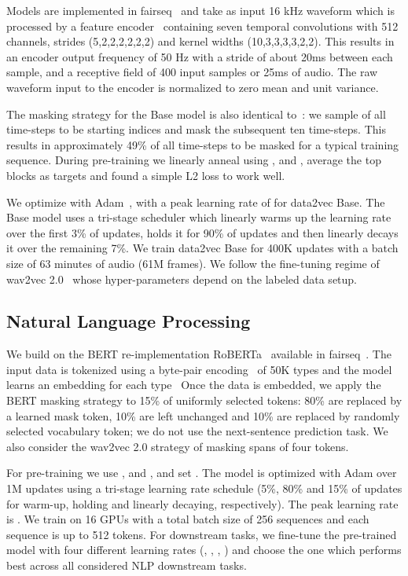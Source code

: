 \documentclass[nohyperref]{article}
\theoremstyle{plain}
\theoremstyle{definition}
\theoremstyle{remark}
\newcommand{\name}{data2vec}
\begin{document}
Models are implemented in fairseq~\cite{ott2019fairseq} and take as input 16 kHz waveform which is processed by a feature encoder~\citep{baevski2020wav} containing seven temporal convolutions with 512 channels, strides (5,2,2,2,2,2,2) and kernel widths (10,3,3,3,3,2,2).
This results in an encoder output frequency of 50 Hz with a stride of about 20ms between each sample, and a receptive field of 400 input samples or 25ms of audio. 
The raw waveform input to the encoder is normalized to zero mean and unit variance.

The masking strategy for the Base model is also identical to~\citet{baevski2020wav}: we sample  of all time-steps to be starting indices and mask the subsequent ten time-steps.
This results in approximately 49\% of all time-steps to be masked for a typical training sequence.
During pre-training we linearly anneal  using ,  and , average the top  blocks as targets and found a simple L2 loss to work well.

We optimize with Adam~\citep{kingma2015adam}, with a peak learning rate of  for \name{} Base. The Base model uses a tri-stage scheduler which linearly warms up the learning rate over the first 3\% of updates, holds it for 90\% of updates and then linearly decays it over the remaining 7\%. 
We train \name{} Base for 400K updates with a batch size of 63 minutes of audio (61M frames).
We follow the fine-tuning regime of wav2vec 2.0~\citep{baevski2020wav} whose hyper-parameters depend on the labeled data setup.


\subsection{Natural Language Processing}
\label{sec:setup_nlp}

We build on the BERT re-implementation RoBERTa~\citep{liu2019roberta} available in fairseq~\citep{ott2019fairseq}.
The input data is tokenized using a byte-pair encoding~\citep{sennrich2016bpe} of 50K types and the model learns an embedding for each type~\citep{devlin2018bert,liu2019roberta} 
Once the data is embedded, we apply the BERT masking strategy to 15\% of uniformly selected tokens: 
80\% are replaced by a learned mask token, 10\% are left unchanged and 10\% are replaced by randomly selected vocabulary token; we do not use the next-sentence prediction task. 
We also consider the wav2vec 2.0 strategy of masking spans of four tokens.

For pre-training we use ,  and ,  and set .
The model is optimized with Adam over 1M updates using a tri-stage learning rate schedule (5\%, 80\% and 15\% of updates for warm-up, holding and linearly decaying, respectively). 
The peak learning rate is .
We train on 16 GPUs with a total batch size of 256 sequences and each sequence is up to 512 tokens.
For downstream tasks, we fine-tune the pre-trained model with four different learning rates (, , , ) and choose the one which performs best across all considered NLP downstream tasks.
\end{document}
